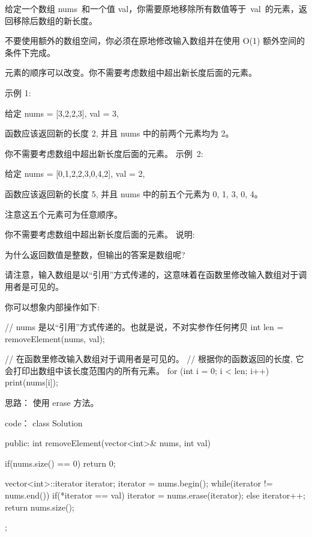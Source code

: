 给定一个数组 nums 和一个值 val，你需要原地移除所有数值等于 val 的元素，返回移除后数组的新长度。

不要使用额外的数组空间，你必须在原地修改输入数组并在使用 O(1) 额外空间的条件下完成。

元素的顺序可以改变。你不需要考虑数组中超出新长度后面的元素。

示例 1:

给定 nums = [3,2,2,3], val = 3,

函数应该返回新的长度 2, 并且 nums 中的前两个元素均为 2。

你不需要考虑数组中超出新长度后面的元素。
示例 2:

给定 nums = [0,1,2,2,3,0,4,2], val = 2,

函数应该返回新的长度 5, 并且 nums 中的前五个元素为 0, 1, 3, 0, 4。

注意这五个元素可为任意顺序。

你不需要考虑数组中超出新长度后面的元素。
说明:

为什么返回数值是整数，但输出的答案是数组呢?

请注意，输入数组是以“引用”方式传递的，这意味着在函数里修改输入数组对于调用者是可见的。

你可以想象内部操作如下:

// nums 是以“引用”方式传递的。也就是说，不对实参作任何拷贝
int len = removeElement(nums, val);

// 在函数里修改输入数组对于调用者是可见的。
// 根据你的函数返回的长度, 它会打印出数组中该长度范围内的所有元素。
for (int i = 0; i < len; i++) {
    print(nums[i]);
}


























思路：
使用 erase 方法。



























code：
class Solution {
public:
    int removeElement(vector<int>& nums, int val) {
        if(nums.size() == 0) return 0;
        
        vector<int>::iterator iterator;
        iterator = nums.begin();
        while(iterator != nums.end())
        {
            if(*iterator == val)
                iterator = nums.erase(iterator);
            else iterator++;
        }
        return nums.size();
    }
};
